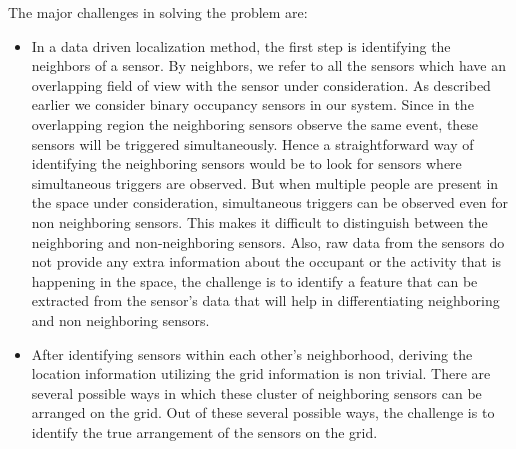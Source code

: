 The major challenges in solving the problem are:
\begin{itemize}
\item In a data driven localization method, the first step is identifying the neighbors of a sensor.
By neighbors, we refer to all the sensors which have an overlapping field of view with the sensor under consideration.
As described earlier we consider binary occupancy sensors in our system.
Since in the overlapping region the neighboring sensors observe the same event, these sensors will be triggered simultaneously.
Hence a straightforward way of identifying the neighboring sensors would be to look for sensors where simultaneous triggers are observed.
But when multiple people are present in the space under consideration, simultaneous triggers can be observed even for non neighboring sensors. This makes it difficult to distinguish between the neighboring and non-neighboring sensors.
Also, raw data from the sensors do not provide any extra information about the occupant or the activity that is happening in the space, the challenge is to identify a feature that can be extracted from the sensor's data that will help in differentiating neighboring and non neighboring sensors.
\item After identifying sensors within each other's neighborhood, deriving the location information utilizing the grid information is non trivial. There are several possible ways in which these cluster of neighboring sensors can be arranged on the grid. Out of these several possible ways, the challenge is to identify the true arrangement of the sensors on the grid.
\end{itemize}


